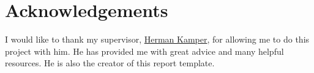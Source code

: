 \chapter*{Acknowledgements}
\makeatletter{}\makeatother

I would like to thank my supervisor, \href{https://www.kamperh.com/}{Herman Kamper}, for allowing me to do this project with him.
He has provided me with great advice and many helpful resources. He is also the creator of this report template.


